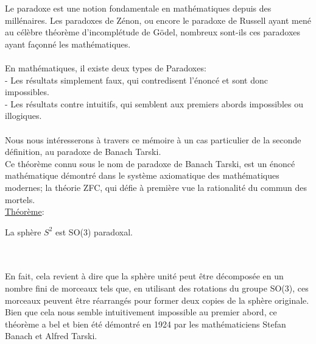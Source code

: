 \documentclass{article}
\begin{document}
Le paradoxe est une notion fondamentale en mathématiques depuis des millénaires. Les paradoxes de Zénon, ou encore le paradoxe de Russell ayant mené au célèbre théorème d’incomplétude de Gödel, nombreux sont-ils ces paradoxes ayant façonné les mathématiques.\\
\\
En mathématiques, il existe deux types de Paradoxes:\\
- Les résultats simplement faux, qui contredisent l’énoncé et sont donc impossibles.\\
- Les résultats contre intuitifs, qui semblent aux premiers abords impossibles ou illogiques.\\
\\
Nous nous intéresserons à travers ce mémoire à un cas particulier de la seconde définition, au paradoxe de Banach Tarski. \\
Ce théorème connu sous le nom de paradoxe de Banach Tarski, est un énoncé mathématique démontré dans le système axiomatique des mathématiques modernes; la théorie ZFC, qui défie à première vue la rationalité du commun des mortels. \\

{\Large \underline{Théorème}}:\\
\begin{center}
     La sphère $S^2$ est SO(3) paradoxal.\\
\end{center}\\~\\

En fait, cela revient à dire que la sphère unité peut être décomposée en un nombre fini de morceaux tels que, en utilisant des rotations du groupe SO(3), ces morceaux peuvent être réarrangés pour former deux copies de la sphère originale.\\
Bien que cela nous  semble intuitivement impossible au premier abord, ce théorème a bel et bien été démontré en 1924 par les mathématiciens Stefan Banach et Alfred Tarski.

\pagebreak
\end{document}
